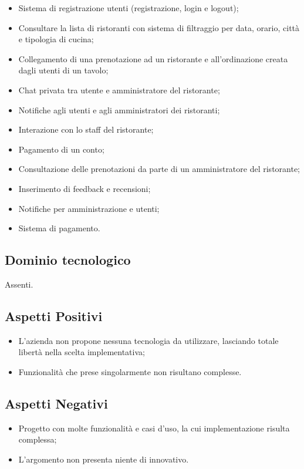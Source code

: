 \documentclass{article}
\begin{document}
\begin{itemize}
  \item Sistema di registrazione utenti (registrazione, login e logout);
  \item Consultare la lista di ristoranti con sistema di filtraggio per data, orario, città e tipologia di cucina;
  \item Collegamento di una prenotazione ad un ristorante e all’ordinazione creata dagli utenti di un tavolo;
  \item Chat privata tra utente e amministratore del ristorante;
  \item Notifiche agli utenti e agli amministratori dei ristoranti;
  \item Interazione con lo staff del ristorante;
  \item Pagamento di un conto;
  \item Consultazione delle prenotazioni da parte di un amministratore del ristorante;
  \item Inserimento di feedback e recensioni;
  \item Notifiche per amministrazione e utenti;
  \item Sistema di pagamento.
\end{itemize}


\subsection{Dominio tecnologico}
Assenti.

\subsection{Aspetti Positivi}
\begin{itemize}
    \item L’azienda non propone nessuna tecnologia da utilizzare, lasciando totale libertà nella scelta implementativa;
    \item Funzionalità che prese singolarmente non risultano complesse.
\end{itemize}

\subsection{Aspetti Negativi}
\begin{itemize}
    \item Progetto con molte funzionalità e casi d’uso, la cui implementazione risulta complessa;
    \item L’argomento non presenta niente di innovativo.
\end{itemize}
\end{document}
